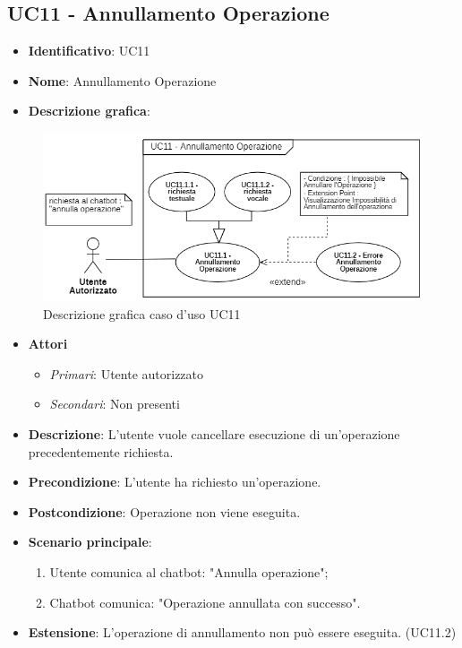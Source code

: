 \subsection{UC11 - Annullamento Operazione }
\begin{itemize}
	\item \textbf{Identificativo}: UC11
	\item \textbf{Nome}: Annullamento Operazione
  \item \textbf{Descrizione grafica}:
\end{itemize}

\begin{figure}[h]
    \includegraphics[scale=1.20]{images/UC11.png} 
    \caption{Descrizione grafica caso d'uso UC11}
\end{figure}
\begin{itemize}
	\item \textbf{Attori}
	\begin{itemize} 
		\item \textit{Primari}: Utente autorizzato
		\item \textit{Secondari}: Non presenti
	\end{itemize}
	\item \textbf{Descrizione}: L'utente vuole cancellare esecuzione di un'operazione precedentemente richiesta.
	\item \textbf{Precondizione}: L'utente ha richiesto un'operazione.
	\item \textbf{Postcondizione}: Operazione non viene eseguita.
	\item \textbf{Scenario principale}: \begin{enumerate}
		\item Utente comunica al chatbot: "Annulla operazione";
		\item Chatbot comunica: "Operazione annullata con successo".
	\end{enumerate}
  \item \textbf{Estensione}: L'operazione di annullamento non può essere eseguita. (UC11.2)
\end{itemize}

